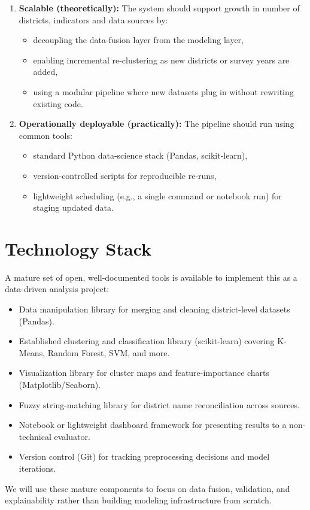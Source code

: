 \documentclass[11pt,a4paper]{article}
\begin{document}
\begin{enumerate}[leftmargin=0.7cm]
    \item \textbf{Scalable (theoretically):} The system should support growth in number of districts, indicators and data sources by:
    \begin{itemize}[leftmargin=0.7cm]
        \item decoupling the data-fusion layer from the modeling layer,
        \item enabling incremental re-clustering as new districts or survey years are added,
        \item using a modular pipeline where new datasets plug in without rewriting existing code.
    \end{itemize}
    
    \item \textbf{Operationally deployable (practically):} The pipeline should run using common tools:
    \begin{itemize}[leftmargin=0.7cm]
        \item standard Python data-science stack (Pandas, scikit-learn),
        \item version-controlled scripts for reproducible re-runs,
        \item lightweight scheduling (e.g., a single command or notebook run) for staging updated data.
    \end{itemize}
\end{enumerate}

\section{Technology Stack}
A mature set of open, well-documented tools is available to implement this as a data-driven analysis project:
\begin{itemize}[leftmargin=0.7cm]
    \item Data manipulation library for merging and cleaning district-level datasets (Pandas).
    \item Established clustering and classification library (scikit-learn) covering K-Means, Random Forest, SVM, and more.
    \item Visualization library for cluster maps and feature-importance charts (Matplotlib/Seaborn).
    \item Fuzzy string-matching library for district name reconciliation across sources.
    \item Notebook or lightweight dashboard framework for presenting results to a non-technical evaluator.
    \item Version control (Git) for tracking preprocessing decisions and model iterations.
\end{itemize}
We will use these mature components to focus on data fusion, validation, and explainability rather than building modeling infrastructure from scratch.
\end{document}
